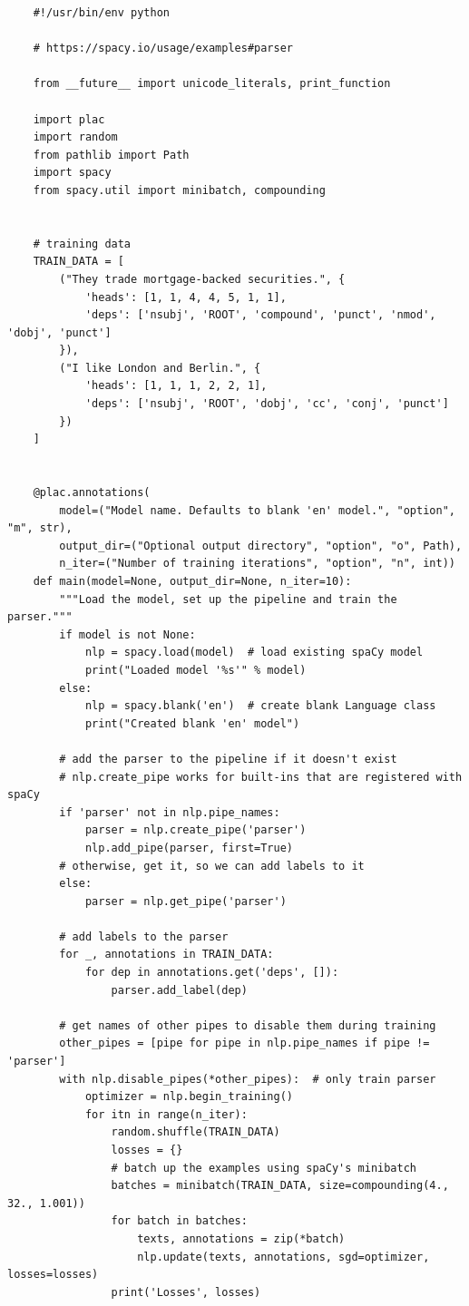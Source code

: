 \documentclass[12pt]{article}
\begin{document}
\begin{verbatim}
	#!/usr/bin/env python

	# https://spacy.io/usage/examples#parser

	from __future__ import unicode_literals, print_function

	import plac
	import random
	from pathlib import Path
	import spacy
	from spacy.util import minibatch, compounding


	# training data
	TRAIN_DATA = [
		("They trade mortgage-backed securities.", {
			'heads': [1, 1, 4, 4, 5, 1, 1],
			'deps': ['nsubj', 'ROOT', 'compound', 'punct', 'nmod', 'dobj', 'punct']
		}),
		("I like London and Berlin.", {
			'heads': [1, 1, 1, 2, 2, 1],
			'deps': ['nsubj', 'ROOT', 'dobj', 'cc', 'conj', 'punct']
		})
	]


	@plac.annotations(
		model=("Model name. Defaults to blank 'en' model.", "option", "m", str),
		output_dir=("Optional output directory", "option", "o", Path),
		n_iter=("Number of training iterations", "option", "n", int))
	def main(model=None, output_dir=None, n_iter=10):
		"""Load the model, set up the pipeline and train the parser."""
		if model is not None:
			nlp = spacy.load(model)  # load existing spaCy model
			print("Loaded model '%s'" % model)
		else:
			nlp = spacy.blank('en')  # create blank Language class
			print("Created blank 'en' model")

		# add the parser to the pipeline if it doesn't exist
		# nlp.create_pipe works for built-ins that are registered with spaCy
		if 'parser' not in nlp.pipe_names:
			parser = nlp.create_pipe('parser')
			nlp.add_pipe(parser, first=True)
		# otherwise, get it, so we can add labels to it
		else:
			parser = nlp.get_pipe('parser')

		# add labels to the parser
		for _, annotations in TRAIN_DATA:
			for dep in annotations.get('deps', []):
				parser.add_label(dep)

		# get names of other pipes to disable them during training
		other_pipes = [pipe for pipe in nlp.pipe_names if pipe != 'parser']
		with nlp.disable_pipes(*other_pipes):  # only train parser
			optimizer = nlp.begin_training()
			for itn in range(n_iter):
				random.shuffle(TRAIN_DATA)
				losses = {}
				# batch up the examples using spaCy's minibatch
				batches = minibatch(TRAIN_DATA, size=compounding(4., 32., 1.001))
				for batch in batches:
					texts, annotations = zip(*batch)
					nlp.update(texts, annotations, sgd=optimizer, losses=losses)
				print('Losses', losses)


\end{verbatim}
\end{document}
